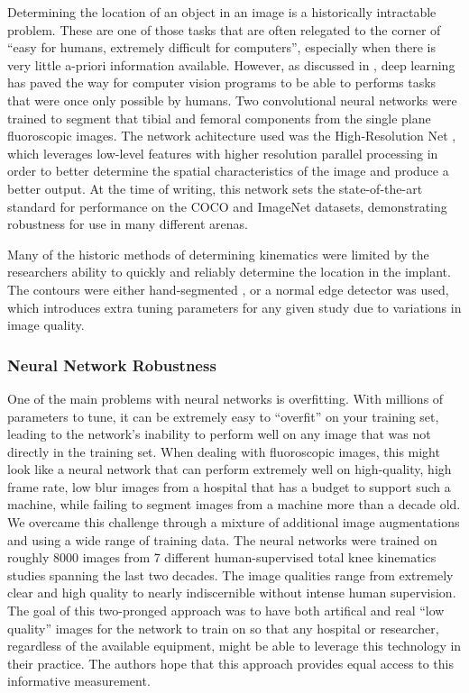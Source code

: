 Determining the location of an object in an image is a historically intractable problem. These are one of those tasks that are often relegated to the corner of ``easy for humans, extremely difficult for computers'', especially when there is very little a-priori information available. However, as discussed in , deep learning has paved the way for computer vision programs to be able to performs tasks that were once only possible by humans. Two convolutional neural networks were trained to segment that tibial and femoral components from the single plane fluoroscopic images. The network achitecture used was the High-Resolution Net \cite{wangDeepHighResolutionRepresentation2020}, which leverages low-level features with higher resolution parallel processing in order to better determine the spatial characteristics of the image and produce a better output. At the time of writing, this network sets the state-of-the-art standard for performance on the COCO and ImageNet datasets, demonstrating robustness for use in many different arenas.

Many of the historic methods of determining kinematics were limited by the researchers ability to quickly and reliably determine the location in the implant. The contours were either hand-segmented \cite{banksAccurateMeasurementThreedimensional1996, zuffiModelbasedMethodReconstruction1999}, or a normal edge detector was used, which introduces extra tuning parameters for any given study due to variations in image quality.


\subsubsection{Neural Network Robustness}
One of the main problems with neural networks is overfitting. With millions of parameters to tune, it can be extremely easy to ``overfit'' on your training set, leading to the network's inability to perform well on any image that was not directly in the training set. When dealing with fluoroscopic images, this might look like a neural network that can perform extremely well on high-quality, high frame rate, low blur images from a hospital that has a budget to support such a machine, while failing to segment images from a machine more than a decade old. We overcame this challenge through a mixture of additional image augmentations \cite{buslaevAlbumentationsFastFlexible2020} and using a wide range of training data. The neural networks were trained on roughly 8000 images from 7 different human-supervised total knee kinematics studies spanning the last two decades. The image qualities range from extremely clear and high quality to nearly indiscernible without intense human supervision. The goal of this two-pronged approach was to have both artifical and real ``low quality'' images for the network to train on so that any hospital or researcher, regardless of the available equipment, might be able to leverage this technology in their practice. The authors hope that this approach provides equal access to this informative measurement.
